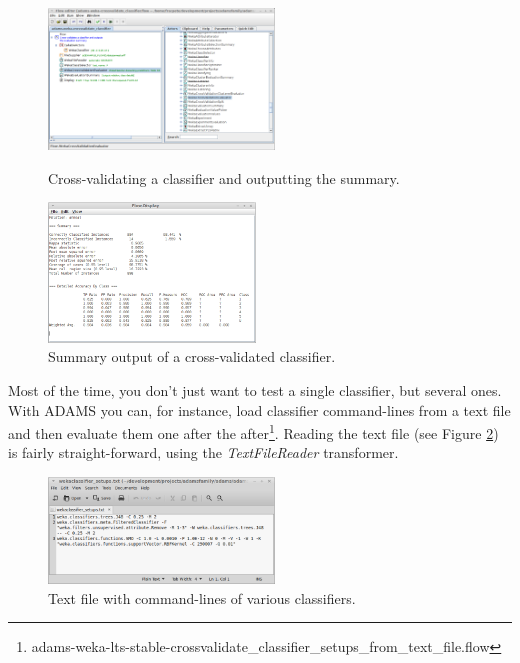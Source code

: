 \begin{figure}[ht]
  \begin{minipage}[t]{0.5\linewidth}
    \centering
    \includegraphics[width=6.0cm]{images/basic-crossvalidate1-flow.png}
    \caption{Cross-validating a classifier and outputting the summary.}
    \label{basic-crossvalidate1-flow}
  \end{minipage}
  \hspace{0.5cm}
  \begin{minipage}[t]{0.5\linewidth}
    \centering
    \includegraphics[width=5.5cm]{images/basic-crossvalidate1-output.png}
    \caption{Summary output of a cross-validated classifier.}
    \label{basic-crossvalidate1-output}
  \end{minipage}
\end{figure}

Most of the time, you don't just want to test a single classifier, but several
ones. With ADAMS you can, for instance, load classifier command-lines from a
text file and then evaluate them one after the
after\footnote{adams-weka-lts-stable-crossvalidate\_classifier\_setups\_from\_text\_file.flow}.
Reading the text file (see Figure
\ref{basic-crossvalidate_multiple_files-setups}) is fairly straight-forward,
using the \textit{TextFileReader} transformer.

\begin{figure}[htb]
  \centering
  \includegraphics[width=6.0cm]{images/basic-crossvalidate_multiple_files-setups.png}
  \caption{Text file with command-lines of various classifiers.}
  \label{basic-crossvalidate_multiple_files-setups}
\end{figure}

